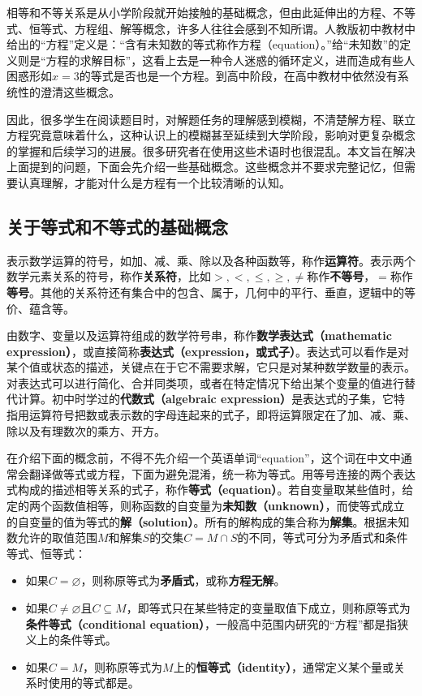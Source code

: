 
\begin{issues}
\issueDraft
\end{issues}


相等和不等关系是从小学阶段就开始接触的基础概念，但由此延伸出的方程、不等式、恒等式、方程组、解等概念，许多人往往会感到不知所谓。人教版初中教材中给出的“方程”定义是：“含有未知数的等式称作方程（equation）。”给“未知数”的定义则是“方程的求解目标”，这看上去是一种令人迷惑的循环定义，进而造成有些人困惑形如$x=3$的等式是否也是一个方程。到高中阶段，在高中教材中依然没有系统性的澄清这些概念。

因此，很多学生在阅读题目时，对解题任务的理解感到模糊，不清楚解方程、联立方程究竟意味着什么，这种认识上的模糊甚至延续到大学阶段，影响对更复杂概念的掌握和后续学习的进展。很多研究者在使用这些术语时也很混乱。本文旨在解决上面提到的问题，下面会先介绍一些基础概念。这些概念并不要求完整记忆，但需要认真理解，才能对什么是方程有一个比较清晰的认知。

\subsection{关于等式和不等式的基础概念}

表示数学运算的符号，如加、减、乘、除以及各种函数等，称作\textbf{运算符}。表示两个数学元素关系的符号，称作\textbf{关系符}，比如$>,<,\leq,\geq,\neq$称作\textbf{不等号}，$=$称作\textbf{等号}。其他的关系符还有集合中的包含、属于，几何中的平行、垂直，逻辑中的等价、蕴含等。

由数字、变量以及运算符组成的数学符号串，称作\textbf{数学表达式（mathematic expression）}，或直接简称\textbf{表达式（expression，或式子）}。表达式可以看作是对某个值或状态的描述，关键点在于它不需要求解，它只是对某种数学数量的表示。对表达式可以进行简化、合并同类项，或者在特定情况下给出某个变量的值进行替代计算。初中时学过的\textbf{代数式（algebraic expression）}是表达式的子集，它特指用运算符号把数或表示数的字母连起来的式子，即将运算限定在了加、减、乘、除以及有理数次的乘方、开方。

在介绍下面的概念前，不得不先介绍一个英语单词“equation”，这个词在中文中通常会翻译做等式或方程，下面为避免混淆，统一称为等式。用等号连接的两个表达式构成的描述相等关系的式子，称作\textbf{等式（equation）}。若自变量取某些值时，给定的两个函数值相等，则称函数的自变量为\textbf{未知数（unknown）}，而使等式成立的自变量的值为等式的\textbf{解（solution）}。所有的解构成的集合称为\textbf{解集}。根据未知数允许的取值范围$M$和解集$S$的交集$C=M\cap S$的不同，等式可分为矛盾式和条件等式、恒等式：
\begin{itemize}
\item 如果$C=\varnothing$，则称原等式为\textbf{矛盾式}，或称\textbf{方程无解}。
\item 如果$C\neq\varnothing$且$C\subseteq M$，即等式只在某些特定的变量取值下成立，则称原等式为\textbf{条件等式（conditional equation）}，一般高中范围内研究的“方程”都是指狭义上的条件等式。
\item 如果$C=M$，则称原等式为$M$上的\textbf{恒等式（identity）}，通常定义某个量或关系时使用的等式都是。
\end{itemize}

